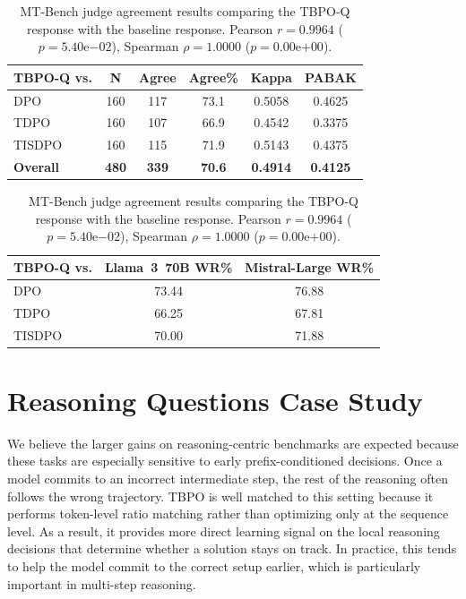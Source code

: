 \documentclass{article}
\theoremstyle{plain}
\theoremstyle{definition}
\theoremstyle{remark}
\begin{document}
\begin{table}[t]
\centering
\small
\setlength{\tabcolsep}{8pt}
\renewcommand{\arraystretch}{1.15}
\begin{tabular}{lccccc}
\toprule
\textbf{TBPO-Q vs.} & \textbf{N} & \textbf{Agree} & \textbf{Agree\%} & \textbf{Kappa} & \textbf{PABAK} \\
\midrule
DPO & 160 & 117 & 73.1 & 0.5058 & 0.4625 \\
TDPO & 160 & 107 & 66.9 & 0.4542 & 0.3375 \\
TISDPO & 160 & 115 & 71.9 & 0.5143 & 0.4375 \\
\midrule
\textbf{Overall} & \textbf{480} & \textbf{339} & \textbf{70.6} & \textbf{0.4914} & \textbf{0.4125} \\
\bottomrule
\end{tabular}

\vspace{0.8em}

\begin{tabular}{lcc}
\toprule
\textbf{TBPO-Q vs.} & \textbf{Llama~3~70B WR\%} & \textbf{Mistral-Large WR\%} \\
\midrule
DPO & 73.44 & 76.88 \\
TDPO & 66.25 & 67.81 \\
TISDPO & 70.00 & 71.88 \\
\bottomrule
\end{tabular}
\caption{MT-Bench judge agreement results comparing the TBPO-Q response with the baseline response. Pearson $r = 0.9964$ ($p = 5.40\mathrm{e}{-02}$), Spearman $\rho = 1.0000$ ($p = 0.00\mathrm{e}{+00}$).}
\label{tab:judge_agreement_mt}
\end{table}

\section{Reasoning Questions Case Study}
\label{app:reasoning_case_study}

We believe the larger gains on reasoning-centric benchmarks are expected because these tasks are especially sensitive to early prefix-conditioned decisions. Once a model commits to an incorrect intermediate step, the rest of the reasoning often follows the wrong trajectory. TBPO is well matched to this setting because it performs token-level ratio matching rather than optimizing only at the sequence level. As a result, it provides more direct learning signal on the local reasoning decisions that determine whether a solution stays on track. In practice, this tends to help the model commit to the correct setup earlier, which is particularly important in multi-step reasoning.
\end{document}
